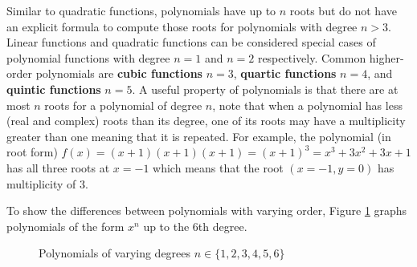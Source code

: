 Similar to quadratic functions, polynomials have up to $n$ roots but do not have an explicit formula to compute those roots for polynomials with degree $n > 3$. Linear functions and quadratic functions can be considered special cases of polynomial functions with degree $n=1$ and $n=2$ respectively. Common higher-order polynomials are \textbf{cubic functions} $n=3$, \textbf{quartic functions} $n=4$, and \textbf{quintic functions} $n=5$. A useful property of polynomials is that there are at most $n$ roots for a polynomial of degree $n$, note that when a polynomial has less (real and complex) roots than its degree, one of its roots may have a multiplicity greater than one meaning that it is repeated. For example, the polynomial (in root form) $f(x) = (x+1)(x+1)(x+1) = (x+1)^3 = x^3 + 3x^2 + 3x + 1$ has all three roots at $x=-1$ which means that the root $(x=-1,y=0)$ has multiplicity of 3.

\begin{example} To show the differences between polynomials with varying order, Figure \ref{fig:polynomials} graphs polynomials of the form $x^n$ up to the $6$th degree.

    \begin{figure}[!ht]
        \centering
        \caption{Polynomials of varying degrees $n \in \{1,2,3,4,5,6\}$}
        \label{fig:polynomials}
    \end{figure}
\end{example}

